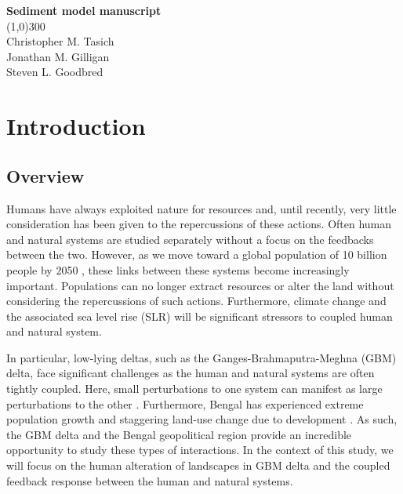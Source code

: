 \documentclass[12pt]{article}
\begin{document}
\begin{titlepage}
	\begin{center}
		\vspace*{\fill}
		\textbf{{\LARGE Sediment model manuscript}}\\
		\line(1,0){300}\\
		Christopher M. Tasich\\
		Jonathan M. Gilligan\\
		Steven L. Goodbred\\
	\end{center}
	\vspace*{\fill}
\end{titlepage}

\section{Introduction}

\subsection{Overview}

Humans have always exploited nature for resources and, until recently, very little consideration has been given to the repercussions of these actions. Often human and natural systems are studied separately without a focus on the feedbacks between the two. However, as we move toward a global population of 10 billion people by 2050 \cite{unitednationsWorldPopulationProspects2017}, these links between these systems become increasingly important. Populations can no longer extract resources or alter the land without considering the repercussions of such actions. Furthermore, climate change and the associated sea level rise (SLR) will be significant stressors to coupled human and natural system.

In particular, low-lying deltas, such as the Ganges-Brahmaputra-Meghna (GBM) delta, face significant challenges as the human and natural systems are often tightly coupled. Here, small perturbations to one system can manifest as large perturbations to the other \cite{hoegh-guldbergImpacts5CGlobal2018}. Furthermore, Bengal has experienced extreme population growth and staggering land-use change due to development \cite{unitednationsWorldPopulationProspects2017}. As such, the GBM delta and the Bengal geopolitical region provide an incredible opportunity to study these types of interactions. In the context of this study, we will focus on the human alteration of landscapes in GBM delta and the coupled feedback response between the human and natural systems.
\end{document}
